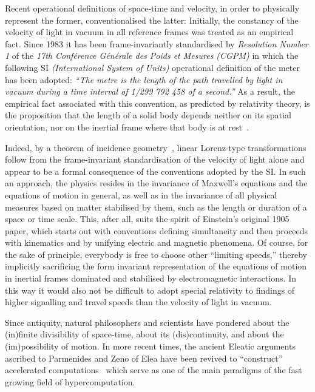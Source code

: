 \documentclass[11pt, pra,amsfonts,showpacs,showkeys]{revtex4}%
\begin{document}
Recent operational definitions of space-time and velocity, in order to physically represent the former, conventionalised the latter:
Initially,  the constancy of the velocity of light in vacuum in all reference frames was treated
as an empirical fact.  Since 1983 it has been
frame-invariantly standardised
by {\it Resolution Number 1} of the {\it  17th Conf{\'e}rence G{\'e}n{\'e}rale des Poids et Mesures (CGPM)}
in which the following SI {\it (International System of Units)} operational definition of the meter
has been adopted:
{\em ``The metre is the length of the path travelled by light
in vacuum during a time interval of 1/299 792 458 of a second.''}
As a result, the empirical fact associated with this convention,
as predicted by relativity theory,
is the proposition that the length of a solid body depends neither on its spatial orientation,
nor on the inertial frame where that body is at rest~\cite{peres-84}.

Indeed, by a theorem of
incidence geometry~\cite{lester},
linear Lorenz-type transformations follow from the frame-invariant standardisation of the velocity of light alone
and appear to be a formal consequence of the conventions adopted by the SI.
In such an approach, the physics resides in the invariance of Maxwell's equations and the equations of motion in general,
as well as in the invariance
of all physical measures based on matter stabilised by them, such as the length or duration of a space or time scale.
This, after all, suits the spirit of Einstein's original 1905 paper,
which starts out with conventions defining simultaneity and then proceeds with kinematics and by unifying electric and magnetic phenomena.
Of course, for the sake of principle, everybody is free to choose other ``limiting speeds,''
thereby implicitly sacrificing the form invariant representation of the equations of motion in inertial frames dominated and stabilised by electromagnetic interactions.
In this way it would also not be difficult to adopt special relativity
to findings of higher signalling and travel speeds than the velocity of light in vacuum.



Since antiquity, natural philosophers and scientists have pondered about
the (in)finite divisibility of space-time, about its (dis)continuity, and
about the (im)possibility of motion.
In more recent times, the ancient Eleatic arguments ascribed to Parmenides and Zeno of Elea
have been revived to ``construct'' accelerated computations~\cite{weyl:49}
which serve as one of the main paradigms of the fast growing field of hypercomputation.
\end{document}
